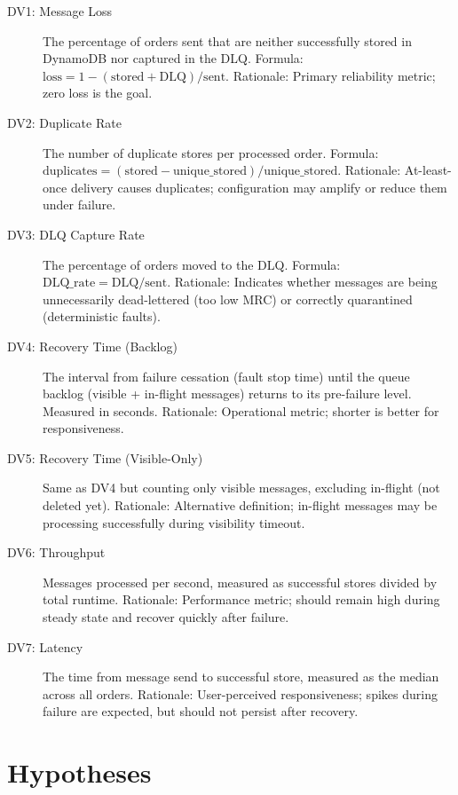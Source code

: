 \begin{description}
    \item[DV1: Message Loss] The percentage of orders sent that are neither successfully stored in DynamoDB nor captured in the DLQ. Formula: \( \text{loss} = 1 - (\text{stored} + \text{DLQ}) / \text{sent} \). Rationale: Primary reliability metric; zero loss is the goal.
    
    \item[DV2: Duplicate Rate] The number of duplicate stores per processed order. Formula: \( \text{duplicates} = (\text{stored} - \text{unique\_stored}) / \text{unique\_stored} \). Rationale: At-least-once delivery causes duplicates; configuration may amplify or reduce them under failure.
    
    \item[DV3: DLQ Capture Rate] The percentage of orders moved to the DLQ. Formula: \( \text{DLQ\_rate} = \text{DLQ} / \text{sent} \). Rationale: Indicates whether messages are being unnecessarily dead-lettered (too low MRC) or correctly quarantined (deterministic faults).
    
    \item[DV4: Recovery Time (Backlog)] The interval from failure cessation (fault stop time) until the queue backlog (visible + in-flight messages) returns to its pre-failure level. Measured in seconds. Rationale: Operational metric; shorter is better for responsiveness.
    
    \item[DV5: Recovery Time (Visible-Only)] Same as DV4 but counting only visible messages, excluding in-flight (not deleted yet). Rationale: Alternative definition; in-flight messages may be processing successfully during visibility timeout.
    
    \item[DV6: Throughput] Messages processed per second, measured as successful stores divided by total runtime. Rationale: Performance metric; should remain high during steady state and recover quickly after failure.
    
    \item[DV7: Latency] The time from message send to successful store, measured as the median across all orders. Rationale: User-perceived responsiveness; spikes during failure are expected, but should not persist after recovery.
\end{description}

\section{Hypotheses}

